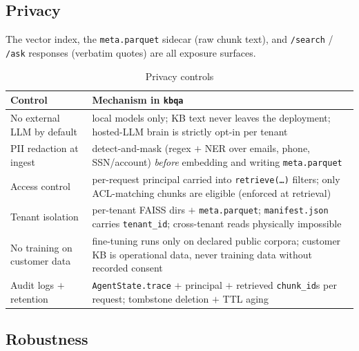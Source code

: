 \documentclass[12pt,a4paper]{article}
\begin{document}
\subsection{Privacy}

The vector index, the \texttt{meta.parquet} sidecar (raw chunk text), and \texttt{/search} / \texttt{/ask} responses (verbatim quotes) are all exposure surfaces.

\begin{table}[H]
\centering
\caption{Privacy controls}
\small
\begin{tabularx}{\linewidth}{@{} l L @{}}
\toprule
\textbf{Control} & \textbf{Mechanism in \texttt{kbqa}} \\
\midrule
No external LLM by default & local models only; KB text never leaves the deployment; hosted-LLM brain is strictly opt-in per tenant \\
PII redaction at ingest & detect-and-mask (regex $+$ NER over emails, phone, SSN/account) \emph{before} embedding and writing \texttt{meta.parquet} \\
Access control & per-request principal carried into \texttt{retrieve(\dots)} filters; only ACL-matching chunks are eligible (enforced at retrieval) \\
Tenant isolation & per-tenant FAISS dirs $+$ \texttt{meta.parquet}; \texttt{manifest.json} carries \texttt{tenant\_id}; cross-tenant reads physically impossible \\
No training on customer data & fine-tuning runs only on declared public corpora; customer KB is operational data, never training data without recorded consent \\
Audit logs $+$ retention & \texttt{AgentState.trace} $+$ principal $+$ retrieved \texttt{chunk\_id}s per request; tombstone deletion $+$ TTL aging \\
\bottomrule
\end{tabularx}
\end{table}

\subsection{Robustness}
\end{document}
